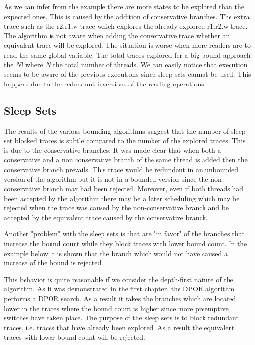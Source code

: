 
As we can infer from the example there are more states to be explored than the expected ones. This is caused by the addition of conservative branches. 
The extra trace such as the r2.r1.w trace which explores the already explored r1.r2.w trace. The algorithm is not aware when adding the 
conservative trace whether an equivalent trace will be explored. The situation is worse when more readers are to read the same global variable.
The total traces explored for a big bound approach the $N!$ where $N$ the total number of threads. We can easily notice that execution seems to be aware of the previous executions since sleep sets cannot
be used. This happens due to the redundant inversions of the reading operations. 

\subsection{Sleep Sets}
The results of the various bounding algorithms suggest that the number of sleep set blocked traces is subtle compared to the number of the explored traces. This is due to the conservative
branches. It was made clear that when both a conservative and a non conservative branch of the same thread is added then the conservative branch prevails. This trace would be 
redundant in an unbounded version of the algorithm but it is not in a bounded version since the non conservative branch may had been rejected. Moreover, even if both threads had been accepted 
by the algorithm there may be a later scheduling which may be rejected when the trace was caused by the non-conservative branch and be accepted by the equivalent trace caused by the conservative
branch. 

Another "problem" with the sleep sets is that are "in favor" of the branches that increase the bound count while they block traces with lower bound count.
In the example below it is shown that the branch which would not have caused a increase of the bound is rejected.


This behavior is quite reasonable if we consider the depth-first nature of the algorithm. As it was demonstrated in the first chapter, the DPOR algorithm performs a DPOR search. As a result
it takes the branches which are located lower in the traces where the bound count is higher since more preemptive switches have taken place. The purpose of the sleep sets is to block redundant traces, i.e. traces that have already been
explored. As a result the equivalent traces with lower bound count will be rejected.

